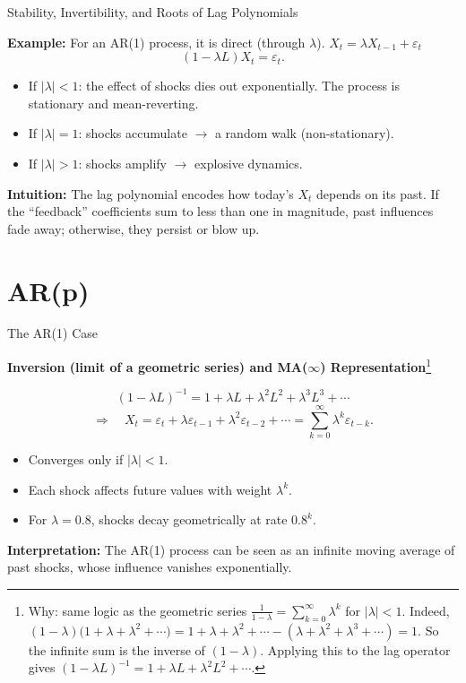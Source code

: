 \documentclass{beamer}
\begin{document}
\begin{frame}{Stability, Invertibility, and Roots of Lag Polynomials}

\textbf{Example:} For an AR(1) process, it is direct (through $\lambda$). \( X_t = \lambda X_{t-1} + \varepsilon_t \)
\[
(1 - \lambda L) X_t = \varepsilon_t.
\]
\begin{itemize}
    \item If $|\lambda| < 1$: the effect of shocks dies out exponentially.  
      The process is stationary and mean-reverting.
    \item If $|\lambda| = 1$: shocks accumulate $\to$ a random walk (non-stationary).
    \item If $|\lambda| > 1$: shocks amplify $\to$ explosive dynamics.
\end{itemize}

\textbf{Intuition:}  
The lag polynomial encodes how today’s $X_t$ depends on its past.  
If the “feedback” coefficients sum to less than one in magnitude, past influences fade away; otherwise, they persist or blow up.

\end{frame}


\section{AR(p)}

\begin{frame}{The AR(1) Case}
\small


\textbf{Inversion (limit of a geometric series) and MA($\infty$) Representation}\footnote{
Why: same logic as the geometric series 
$\frac{1}{1-\lambda} = \sum_{k=0}^{\infty}\lambda^k$ for $|\lambda|<1$.
Indeed,
$(1-\lambda)\big(1+\lambda+\lambda^2+\cdots\big)
=1+ \lambda + \lambda^2 + \cdots 
- (\lambda + \lambda^2 + \lambda^3 + \cdots) = 1$.
So the infinite sum is the inverse of $(1-\lambda)$.
Applying this to the lag operator gives 
$(1-\lambda L)^{-1}=1+\lambda L+\lambda^2 L^2+\cdots$.}

\[
(1 - \lambda L)^{-1} = 1 + \lambda L + \lambda^2 L^2 + \lambda^3 L^3 + \cdots
\]
\[
\Rightarrow \quad X_t = \varepsilon_t + \lambda \varepsilon_{t-1} + \lambda^2 \varepsilon_{t-2} + \cdots 
        = \sum_{k=0}^{\infty} \lambda^k \varepsilon_{t-k}.
\]
\begin{itemize}
    \item Converges only if $|\lambda|<1$.
    \item Each shock affects future values with weight $\lambda^k$.
    \item For $\lambda=0.8$, shocks decay geometrically at rate $0.8^k$.
\end{itemize}

\textbf{Interpretation:}  
The AR(1) process can be seen as an infinite moving average of past shocks,  
whose influence vanishes exponentially.

\end{frame}
\end{document}
